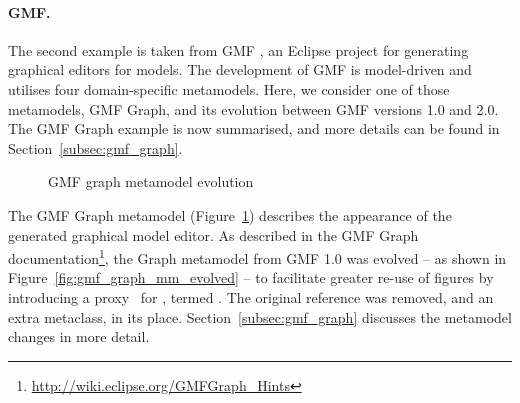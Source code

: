 \paragraph{GMF.}
The second example is taken from GMF \cite{gronback09emp}, an Eclipse project for generating graphical editors for models. The development of GMF is model-driven and utilises four domain-specific metamodels. Here, we consider one of those metamodels, GMF Graph, and its evolution between GMF versions 1.0 and 2.0. The GMF Graph example is now summarised, and more details can be found in Section~\ref{subsec:gmf_graph}.

\begin{figure}[htbp]
	\centering
	\caption{GMF graph metamodel evolution}
\label{fig:gmf_graph_mms}
\end{figure}

The GMF Graph metamodel (Figure~\ref{fig:gmf_graph_mms}) describes the appearance of the generated graphical model editor. As described in the GMF Graph documentation\footnote{\url{http://wiki.eclipse.org/GMFGraph_Hints}}, the Graph metamodel from GMF 1.0 was evolved -- as shown in Figure~\ref{fig:gmf_graph_mm_evolved} -- to facilitate greater re-use of figures by introducing a proxy~\cite{gamma95patterns} for , termed . The original  reference was removed, and an extra metaclass,  in its place. Section~\ref{subsec:gmf_graph} discusses the metamodel changes in more detail.


